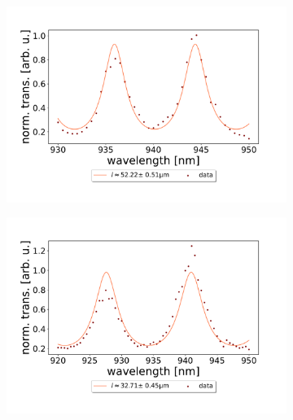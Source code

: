 \begin{figure}[h!]
\begin{subfigure}[b]{0.49\textwidth}
        \includegraphics[width=\textwidth]{figures/results/double fano fits/20250326/53um_M3:M5_FSR_scan.pdf}
        \caption{}
        \label{fig:53um_M3:M5_FSR_scan}
    \end{subfigure}
    \begin{subfigure}[b]{0.49\textwidth}
        \includegraphics[width=\textwidth]{figures/results/double fano fits/20250326/33um_M3:M5_FSR_scan.pdf}
        \caption{}
        \label{fig:33um_M3:M5_FSR_scan}
    \end{subfigure}
\end{figure}
